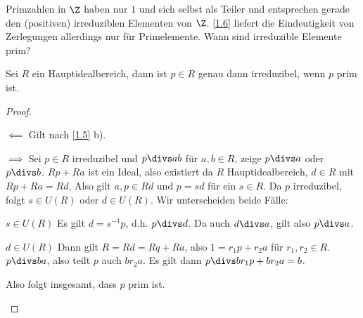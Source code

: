 Primzahlen in $\Z$ haben nur $1$ und sich selbst als Teiler und entsprechen gerade den (positiven) irreduziblen Elementen von $\Z$.
\ref{1.6} liefert die Eindeutigkeit von Zerlegungen allerdings nur für Primelemente.
Wann sind irreduzible Elemente prim?


\begin{lem} \label{1.7}
	Sei $R$ ein Hauptidealbereich, dann ist $p \in R$ genau dann irreduzibel, wenn $p$ prim ist.
	\begin{proof}
		\begin{segnb}{$\impliedby$}
			Gilt nach \ref{1.5} b).
		\end{segnb}
		\begin{segnb}{$\implies$}
			Sei $p \in R$ irreduzibel und $p \divs ab$ für $a, b \in R$, zeige $p \divs a$ oder $p \divs b$.
			$Rp + Ra$ ist ein Ideal, also existiert da $R$ Hauptidealbereich, $d \in R$ mit $Rp + Ra = Rd$.
			Also gilt $a,p \in Rd$ und $p = sd$ für ein $s \in R$.
			Da $p$ irreduzibel, folgt $s \in U(R)$ oder $d \in U(R)$.
			Wir unterscheiden beide Fälle:
			\begin{segnb}{$s\in U(R)$}
				Es gilt $d = s^{-1}p$, d.h. $p \divs d$.
				Da auch $d \divs a$, gilt also $p\divs a$.
			\end{segnb}
			\begin{segnb}{$d\in U(R)$}
				Dann gilt $R = Rd = Rq + Ra$, also $1 = r_1 p + r_2 a$ für $r_1, r_2 \in R$.
				$p \divs ba$, also teilt $p$ auch $b r_2 a$.
				Es gilt dann $p \divs b r_1 p + b r_2 a = b$.
			\end{segnb}
			Also folgt insgesamt, dass $p$ prim ist.
		\end{segnb}
	\end{proof}
\end{lem}


